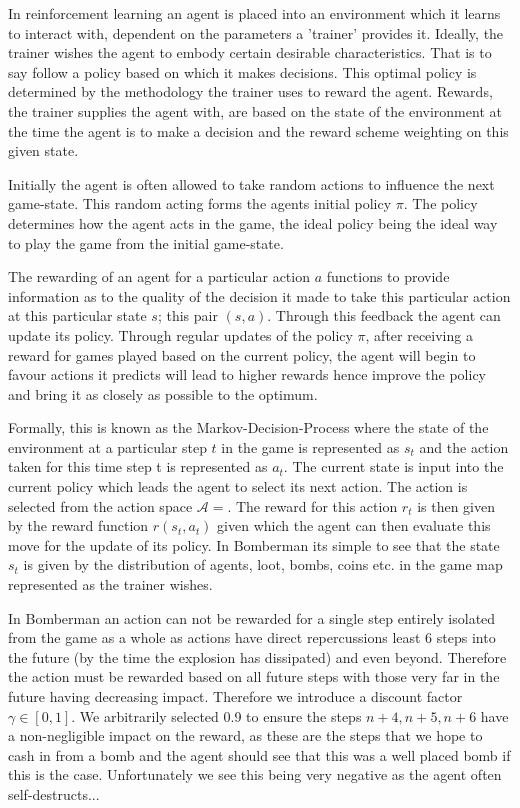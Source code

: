 In reinforcement learning an agent is placed into an environment which it learns to interact with, dependent on the parameters a 'trainer' provides it. Ideally, the trainer wishes the agent to embody certain desirable characteristics. That is to say follow a policy based on which it makes decisions. This optimal policy is determined by the methodology the trainer uses to reward the agent. Rewards, the trainer supplies the agent with, are based on the state of the environment at the time the agent is to make a decision and the reward scheme weighting on this given state. 

Initially the agent is often allowed to take random actions to influence the next game-state. This random acting forms the agents initial policy $\pi$. The policy determines how the agent acts in the game, the ideal policy being the ideal way to play the game from the initial game-state.

The rewarding of an agent for a particular action $a$ functions to provide information as to the quality of the decision it made to take this particular action at this particular state $s$; this  pair $(s, a)$. Through this feedback the agent can update its policy. Through regular updates of the policy $\pi$, after receiving a reward for games played based on the current policy, the agent will begin to favour actions it predicts will lead to higher rewards hence improve the policy and bring it as closely as possible to the optimum.

Formally, this is known as the Markov-Decision-Process where the state of the environment at a particular step $t$ in the game is represented as $s_t$ and the action taken for this time step t is represented as $a_t$. The current state is input into the current policy which leads the agent to select its next action. The action is selected from the action space $\mathcal{A} = $. The reward for this action $r_t$ is then given by the reward function $r(s_t, a_t)$ given which the agent can then evaluate this move for the update of its policy. In Bomberman its simple to see that the state $s_t$ is given by the distribution of agents, loot, bombs, coins etc. in the game map represented as the trainer wishes. 

In Bomberman an action can not be rewarded for a single step entirely isolated from the game as a whole as actions have direct repercussions least 6 steps into the future (by the time the explosion has dissipated) and even beyond. Therefore the action must be rewarded based on all future steps with those very far in the future having decreasing impact. Therefore we introduce a discount factor $\gamma \in [0, 1]$. We arbitrarily selected 0.9 to ensure the steps $n+4, n+5, n+6$ have a non-negligible impact on the reward, as these are the steps that we hope to cash in from a bomb and the agent should see that this was a well placed bomb if this is the case. Unfortunately we see this being very negative as the agent often self-destructs...

